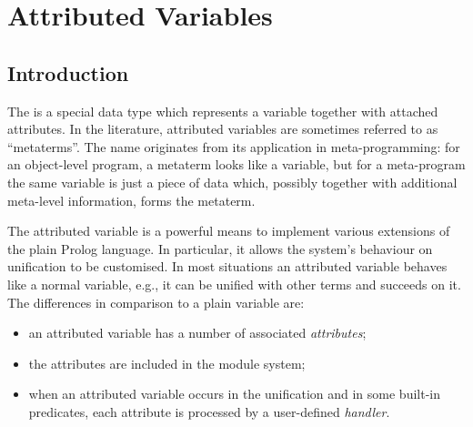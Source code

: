 %
%
%
%
%

%

\chapter{Attributed Variables}
\label{attrvars}
\label{metaterms}

\section{Introduction}
The  is a special \eclipse data type which
represents a variable together with attached attributes.
In the literature, attributed variables are sometimes referred to as
``metaterms''.
The name  originates from its application in meta-programming:
for an object-level program, a metaterm looks like a variable, but for
a meta-program the same variable is just a piece of data which, possibly
together with additional meta-level information, forms the metaterm.

The attributed variable is a powerful means to implement various extensions of
the
plain Prolog language.
In particular, it allows the system's behaviour
on unification to be customised.
In most situations an attributed variable behaves like a normal
variable, e.g.,
it can be unified with other terms and
 succeeds on it.
The differences in comparison to a plain variable are:
\begin{itemize}
\item an attributed variable has a number of associated \emph{attributes};
\item the attributes are included in the module system;
\item when an attributed variable occurs in the unification and in some
built-in predicates, each attribute is processed by a user-defined
\emph{handler}.
\end{itemize}

